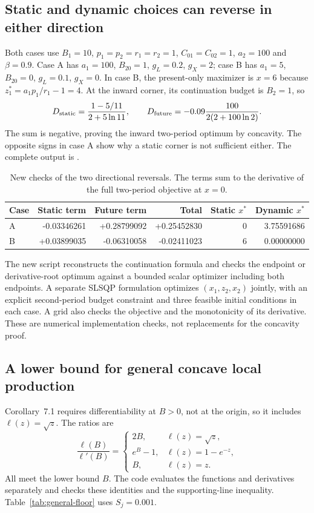 \documentclass[11pt,a4paper]{article}
\begin{document}
\subsection*{Static and dynamic choices can reverse in either direction}
Both cases use $B_1=10$, $p_1=p_2=r_1=r_2=1$, $C_{01}=C_{02}=1$,
$a_2=100$ and $\beta=0.9$. Case A has $a_1=100$, $B_{20}=1$,
$g_L=0.2$, $g_X=2$; case B has $a_1=5$, $B_{20}=0$,
$g_L=0.1$, $g_X=0$. In case B, the present-only maximizer is $x=6$
because $z_1^*=a_1p_1/r_1-1=4$. At the inward corner, its continuation
budget is $B_2=1$, so
\[
 D_{\rm static}=\frac{1-5/11}{2+5\ln 11},\qquad
 D_{\rm future}=-0.09\frac{100}{2(2+100\ln 2)}.
\]
The sum is negative, proving the inward two-period optimum by concavity.
The opposite signs in case A show why a static corner is not sufficient
either. The complete output is .

\begin{table}[htbp]\centering
\caption{New checks of the two directional reversals. The terms sum to
the derivative of the full two-period objective at $x=0$.}
\label{tab:dynamic-reversals}
\begin{tabular}{@{}lrrrrr@{}}\toprule
Case & Static term & Future term & Total & Static $x^*$ & Dynamic $x^*$\\\midrule
A & -0.03346261 & +0.28799092 & +0.25452830 & 0 & 3.75591686 \\
B & +0.03899035 & -0.06310058 & -0.02411023 & 6 & 0.00000000 \\
\bottomrule\end{tabular}\end{table}

The new script reconstructs the continuation formula and checks the
endpoint or derivative-root optimum against a bounded scalar optimizer
including both endpoints. A separate SLSQP formulation optimizes
$(x_1,z_2,x_2)$ jointly, with an explicit second-period budget constraint
and three feasible initial conditions in each case. A grid also checks
the objective and the monotonicity of its derivative. These are numerical
implementation checks, not replacements for the concavity proof.

\subsection*{A lower bound for general concave local production}
Corollary~7.1 requires differentiability at $B>0$, not at the origin,
so it includes $\ell(z)=\sqrt z$. The ratios are
\[
 \frac{\ell(B)}{\ell'(B)}=
 \begin{cases}
  2B,&\ell(z)=\sqrt z,\\
  e^B-1,&\ell(z)=1-e^{-z},\\
  B,&\ell(z)=z.
 \end{cases}
\]
All meet the lower bound $B$. The code evaluates the functions and
derivatives separately and checks these identities and the supporting-line
inequality. Table~\ref{tab:general-floor} uses $S_j=0.001$.
\end{document}
